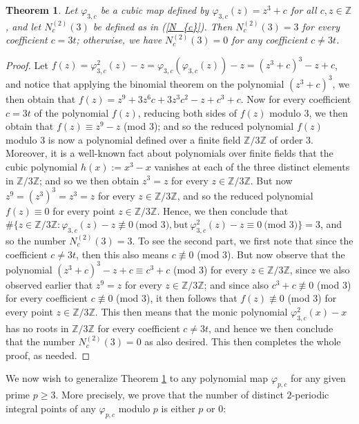 \documentclass{article}
\theoremstyle{plain}
\newtheorem{thm}{Theorem}[section]
\theoremstyle{definition}
\begin{document}
\begin{thm} \label{2.1}
Let $\varphi_{3, c}$ be a cubic map defined by $\varphi_{3, c}(z) = z^3 + c$ for all $c, z\in\mathbb{Z}$, and let $N_{c}^{(2)}(3)$ be defined as in \textnormal{(\ref{N_{c}})}. Then $N_{c}^{(2)}(3) = 3$ for every coefficient $c = 3t$; otherwise, we have $N_{c}^{(2)}(3) = 0$ for any coefficient $c \neq  3t$. 
\end{thm}
\begin{proof}
Let $f(z)= \varphi_{3, c}^2(z)-z = \varphi_{3,c}(\varphi_{3,c}(z)) -z= (z^3+c)^3 - z + c$, and notice that applying the binomial theorem on the polynomial $(z^3 + c)^3$, we then obtain that $f(z) = z^9 + 3z^6c + 3z^3c^2-z+ c^3 + c$. Now for every coefficient $c=3t$ of the polynomial $f(z)$, reducing both sides of $f(z)$ modulo $3$, we then obtain that $f(z)\equiv z^9 - z$ (mod $3$); and so the reduced polynomial $f(z)$ modulo $3$ is now a polynomial defined over a finite field $\mathbb{Z}\slash 3\mathbb{Z}$ of order 3. Moreover, it is a well-known fact about polynomials over finite fields that the cubic polynomial $h(x):=x^3-x$ vanishes at each of the three distinct elements in $\mathbb{Z}\slash 3\mathbb{Z}$; and so we then obtain $z^3 = z$ for every $z\in \mathbb{Z}\slash 3\mathbb{Z}$. But now $z^9 = (z^3)^3 = z^3 = z$ for every $z\in \mathbb{Z}\slash 3\mathbb{Z}$, and so the reduced polynomial $f(z)\equiv 0$ for every point $z\in \mathbb{Z}\slash 3\mathbb{Z}$. Hence, we then conclude that $\#\{ z\in \mathbb{Z} / 3\mathbb{Z}:\varphi_{3,c}(z) -z \not \equiv 0 \ \text{(mod $3$)}, \text{but} \ \varphi_{3,c}^2(z) - z \equiv 0 \ \text{(mod $3$)}\} = 3$, and so the number $N_{c}^{(2)}(3) = 3$. To see the second part, we first note that since the coefficient $c\neq 3t$, then this also means $c\not \equiv 0$ (mod 3). But now observe that the polynomial $(z^3+c)^3 - z + c\equiv c^3 + c$ (mod 3) for every $z\in \mathbb{Z} / 3\mathbb{Z}$, since we also observed earlier that $z^9 = z$ for every $z\in \mathbb{Z}\slash 3\mathbb{Z}$; and since also $c^3 + c \not \equiv 0$ (mod 3) for every coefficient $c\not \equiv 0$ (mod 3), it then follows that $f(z)\not \equiv 0$ (mod 3) for every point $z\in \mathbb{Z} / 3\mathbb{Z}$. This then means that the monic polynomial $\varphi_{3,c}^2(x)-x$ has no roots in $\mathbb{Z} / 3\mathbb{Z}$ for every coefficient $c\neq 3t$, and hence we then conclude that the number $N_{c}^{(2)}(3) = 0$ as also desired. This then completes the whole proof, as needed.
\end{proof} 
We now wish to generalize Theorem \ref{2.1} to any polynomial map $\varphi_{p, c}$ for any given prime $p\geq 3$. More precisely, we prove that the number of distinct $2$-periodic integral points of any $\varphi_{p, c}$ modulo $p$ is either $p$ or $0$:
\end{document}
